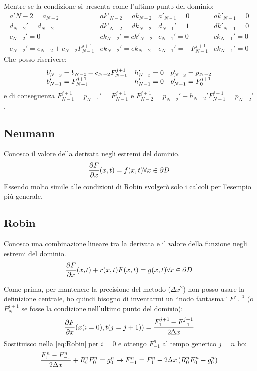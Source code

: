 Mentre se la condizione si presenta come l'ultimo punto del dominio:
\begin{equation}
  \begin{array}{ll|ll}
    a'{N-2} = a_{N-2}	& ak'_{N-2}= ak_{N-2}	&	a'_{N-1} = 0	& ak'_{N-1}= 0\\
    d_{N-2}' = d_{N-2}	& dk'_{N-2} = dk_{N-2}	&	d_{N-1}' = 1	& dk'_{N-1} = 0\\
    c_{N-2}' =  0		& ck_{N-2}' = ck'_{N-2}	&	c_{N-1}' =  0	& ck_{N-1}' = 0\\
    e_{N-2}' = e_{N-2}+c_{N-2}F_{N-1}^{j+1} & ek_{N-2}' = ek_{N-2}	&	e_{N-1}' =  -F^{j+1}_{N-1} & ek_{N-1}' = 0
  \end{array}
\end{equation}
Che posso riscrivere:
\begin{equation}
  \begin{array}{l l l}
    b_{N-2}' = b_{N-2} - c_{N-2} F_{N-1}^{j+1}  &h_{N-2}' = 0&p_{N-2}' = p_{N-2}\\
    b_{N-1}' = F_{N-1}^{j+1}&h_{N-1}' = 0&p_{N-1}' = F_0^{j+1}
  \end{array}
\end{equation}
e di conseguenza $F_{N-1}^{j+1} = p_{N-1}' = F_{N-1}^{j+1}$ e $F_{N-2}^{j+1} = p_{N-2}'+h_{N-2}' F_{N-1}^{j+1} =  p_{N-2}'$.

\subsection{Neumann}
Conosco il valore della derivata negli estremi del dominio.
\begin{equation}
  \frac{\partial F}{\partial x}(x,t) = f(x,t) \forall x \in \partial D
\end{equation}
Essendo molto simile alle condizioni di Robin svolger\`o solo i calcoli per l'esempio pi\`u generale.

\subsection{Robin}
Conosco una combinazione lineare tra la derivata e il valore della funzione negli estremi del dominio.
\begin{equation}\label{eq:Robin}
  \frac{\partial F}{\partial x}(x,t) +r(x,t) F(x,t) = g(x,t) \forall x \in \partial D
\end{equation}

Come prima, per mantenere la precisione del metodo ($\Delta x^2$) non posso usare la definizione  centrale,  ho quindi bisogno di inventarmi un ``nodo fantasma'' $F_{-1}^{j+1}$ (o $F_{N}^{j+1}$ se fosse la condizione nell'ultimo punto del dominio):
\begin{equation}
  \frac{\partial F}{\partial x}(x(i=0),t(j=j+1)) = \frac{F_{1}^{j+1}-F_{-1}^{j+1}}{2\Delta x}
\end{equation}
Sostituisco nella \eqref{eq:Robin} per $i=0$ e ottengo $F_{-1}^{n}$ al tempo generico $j=n$ ho:
\begin{equation}
  \frac{F_{1}^{n}-F_{-1}^{n}}{2\Delta x} + R_0^nF_{0}^{n} = g_0^n  \to 
  F_{-1}^{n} = F_{1}^{n} + 2\Delta x \left( R_0^nF_{0}^{n}-g^n_0 \right)
\end{equation}

